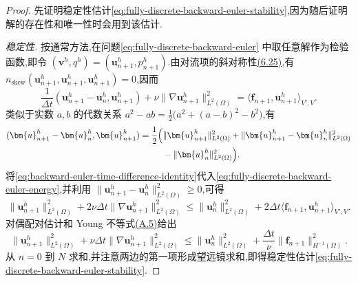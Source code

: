 \begin{proof}
先证明稳定性估计\cref{eq:fully-discrete-backward-euler-stability},因为随后证明解的存在性和唯一性时会用到该估计.

\textit{稳定性.} 按通常方法,在问题\cref{eq:fully-discrete-backward-euler} 中取任意解作为检验函数,即令 $(\bm{v}^h,q^h)=(\bm{u}_{n+1}^h,p_{n+1}^h)$.由对流项的斜对称性\hyperref[eq:steady-ns-nskew-definition]{(6.25)},有
$n_{\mathrm{skew}}(\bm{u}_{n+1}^h,\bm{u}_{n+1}^h,\bm{u}_{n+1}^h)=0$,因而
\begin{equation}\label{eq:fully-discrete-backward-euler-energy}
  \frac1{\Delta t}(\bm{u}_{n+1}^h-\bm{u}_n^h,\bm{u}_{n+1}^h)
   +\nu\|\nabla\bm{u}_{n+1}^h\|_{L^2(\Omega)}^2
    =\langle\bm{f}_{n+1},\bm{u}_{n+1}^h\rangle_{V',V}.
\end{equation}
类似于实数 $a,b$ 的代数关系
$a^2-ab=\tfrac12\bigl(a^2+(a-b)^2-b^2\bigr)$,有
\begin{equation}\label{eq:backward-euler-time-difference-identity}
\begin{aligned}
 (\bm{u}_{n+1}^h-\bm{u}_n^h,\bm{u}_{n+1}^h)
  =\frac12\Bigl(&\|\bm{u}_{n+1}^h\|_{L^2(\Omega)}^2
       +\|\bm{u}_{n+1}^h-\bm{u}_n^h\|_{L^2(\Omega)}^2\\
       &-\|\bm{u}_n^h\|_{L^2(\Omega)}^2\Bigr).
\end{aligned}
\end{equation}
将\cref{eq:backward-euler-time-difference-identity}代入\cref{eq:fully-discrete-backward-euler-energy},并利用
$\|\bm{u}_{n+1}^h-\bm{u}_n^h\|_{L^2(\Omega)}^2\ge0$,可得
\[
  \|\bm{u}_{n+1}^h\|_{L^2(\Omega)}^2
   +2\nu\Delta t\|\nabla\bm{u}_{n+1}^h\|_{L^2(\Omega)}^2
  \le \|\bm{u}_n^h\|_{L^2(\Omega)}^2
     +2\Delta t\langle\bm{f}_{n+1},\bm{u}_{n+1}^h\rangle_{V',V}.
\]
对偶配对估计和 Young 不等式\hyperref[eq:appendix-a-5]{(A.5)}给出
\[
  \|\bm{u}_{n+1}^h\|_{L^2(\Omega)}^2
   +\nu\Delta t\|\nabla\bm{u}_{n+1}^h\|_{L^2(\Omega)}^2
  \le \|\bm{u}_n^h\|_{L^2(\Omega)}^2
     +\frac{\Delta t}{\nu}
       \|\bm{f}_{n+1}\|_{H^{-1}(\Omega)}^2.
\]
从 $n=0$ 到 $N$ 求和,并注意两边的第一项形成望远镜求和,即得稳定性估计\cref{eq:fully-discrete-backward-euler-stability}.


\end{proof}
